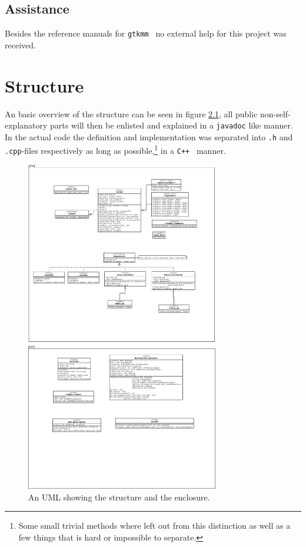 \documentclass[a4paper,11pt]{kth-mag}
\newcommand{\Cpp}{\texttt{C++}}
\newcommand{\Gtkmm}{\texttt{gtkmm}}
\begin{document}
\section{Assistance}
Besides the reference manuals for \Gtkmm ~ no external help for this project was
received.

\chapter{Structure}
An basic overview of the structure can be seen in figure \ref{fig:UML}, all
public non-self-explanatory parts will then be enlisted and explained in 
a \verb+javadoc+ like manner. In the actual code the definition and
implementation was separated into \texttt{.h} and \texttt{.cpp}-files
respectively as long as possible,\footnote{Some small trivial methods where
left out from this distinction as well as a few things that is hard or
impossible to separate.} in a \Cpp~ manner.
\begin{figure}[ht]
\begin{center}
    \includegraphics[width=0.75\textwidth]{uml.pdf}
    \caption{\small{An UML showing the structure and the enclosure.}}\label{fig:UML}
\end{center}
\end{figure}
\end{document}
